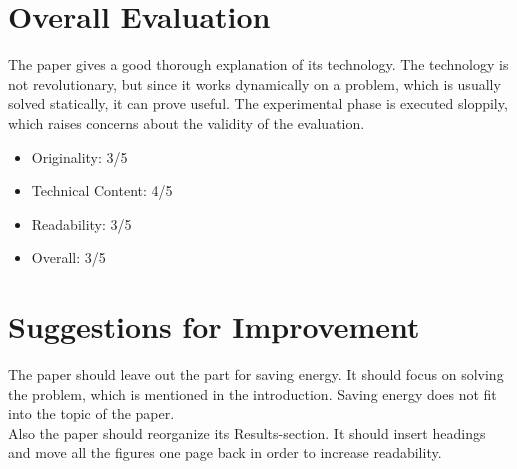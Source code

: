 \documentclass[a4paper]{article}
\begin{document}
\section{Overall Evaluation}
The paper gives a good thorough explanation of its technology. The technology is not revolutionary, but since it works dynamically on a problem, which is usually solved statically, it can prove useful. The experimental phase is executed sloppily, which raises concerns about the validity of the evaluation.
\begin{itemize}
\setlength{\itemsep}{-2pt}
\item Originality: 3/5
\item Technical Content: 4/5
\item Readability: 3/5
\item Overall: 3/5
\end{itemize}

\section{Suggestions for Improvement}
The paper should leave out the part for saving energy. It should focus on solving the problem, which is mentioned in the introduction. Saving energy does not fit into the topic of the paper.\\
Also the paper should reorganize its Results-section. It should insert headings and move all the figures one page back in order to increase readability.
\end{document}
